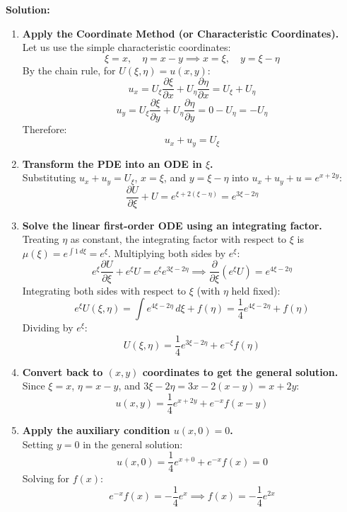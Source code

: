 \documentclass[11pt]{article}
\begin{document}
\textbf{Solution:}
\begin{enumerate}[label=\textbf{Step \arabic*:}]
    \item \textbf{Apply the Coordinate Method (or Characteristic Coordinates).} \\
    Let us use the simple characteristic coordinates:
    \[
    \xi = x, \quad \eta = x - y \implies x = \xi, \quad y = \xi - \eta
    \]
    By the chain rule, for $U(\xi, \eta) = u(x, y)$:
    \[
    u_x = U_\xi \frac{\partial \xi}{\partial x} + U_\eta \frac{\partial \eta}{\partial x} = U_\xi + U_\eta
    \]
    \[
    u_y = U_\xi \frac{\partial \xi}{\partial y} + U_\eta \frac{\partial \eta}{\partial y} = 0 - U_\eta = -U_\eta
    \]
    Therefore:
    \[
    u_x + u_y = U_\xi
    \]

    \item \textbf{Transform the PDE into an ODE in $\xi$.} \\
    Substituting $u_x + u_y = U_\xi$, $x = \xi$, and $y = \xi - \eta$ into $u_x + u_y + u = e^{x+2y}$:
    \[
    \frac{\partial U}{\partial \xi} + U = e^{\xi + 2(\xi - \eta)} = e^{3\xi - 2\eta}
    \]

    \item \textbf{Solve the linear first-order ODE using an integrating factor.} \\
    Treating $\eta$ as constant, the integrating factor with respect to $\xi$ is $\mu(\xi) = e^{\int 1\,d\xi} = e^\xi$. Multiplying both sides by $e^\xi$:
    \[
    e^\xi \frac{\partial U}{\partial \xi} + e^\xi U = e^\xi e^{3\xi - 2\eta} \implies \frac{\partial}{\partial \xi}\left(e^\xi U\right) = e^{4\xi - 2\eta}
    \]
    Integrating both sides with respect to $\xi$ (with $\eta$ held fixed):
    \[
    e^\xi U(\xi, \eta) = \int e^{4\xi - 2\eta}\,d\xi + f(\eta) = \frac{1}{4}e^{4\xi - 2\eta} + f(\eta)
    \]
    Dividing by $e^\xi$:
    \[
    U(\xi, \eta) = \frac{1}{4}e^{3\xi - 2\eta} + e^{-\xi}f(\eta)
    \]

    \item \textbf{Convert back to $(x, y)$ coordinates to get the general solution.} \\
    Since $\xi = x$, $\eta = x - y$, and $3\xi - 2\eta = 3x - 2(x - y) = x + 2y$:
    \[
    u(x, y) = \frac{1}{4}e^{x+2y} + e^{-x}f(x - y)
    \]

    \item \textbf{Apply the auxiliary condition $u(x, 0) = 0$.} \\
    Setting $y = 0$ in the general solution:
    \[
    u(x, 0) = \frac{1}{4}e^{x + 0} + e^{-x}f(x) = 0
    \]
    Solving for $f(x)$:
    \[
    e^{-x}f(x) = -\frac{1}{4}e^x \implies f(x) = -\frac{1}{4}e^{2x}
    \]


\end{enumerate}
\end{document}
